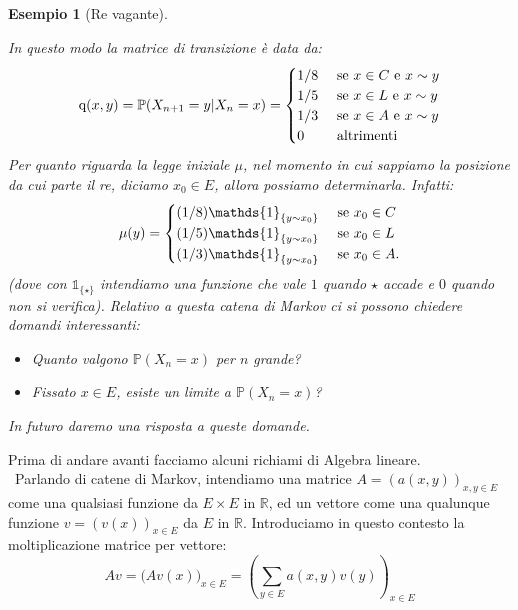 \documentclass[11pt]{book}
\theoremstyle{Definizione}
\theoremstyle{TeoremaProposizioneLemmaCorollario}
\theoremstyle{OsservazioneNota}
\newtheorem{myes}{Esempio}[section]
\newcommand{\R}{\mathbb{R}}
\renewcommand{\P}{\mathbb{P}}
\newcommand{\q}{\textup{q}}
\newcommand{\uno}[1]{\mathds{1}_{#1}}
\begin{document}
\begin{myes}[Re vagante]
\begin{center}
\end{center}
In questo modo la matrice di transizione è data da:
$$
\q(x,y) = \P(X_{n+1} = y | X_n =x)= \begin{cases}
1/8 &\textup{ se }x\in C\textup{ e }x\sim y\\
1/5 &\textup{ se }x\in L\textup{ e }x\sim y\\
1/3 &\textup{ se }x\in A\textup{ e }x\sim y\\
0 &\textup{ altrimenti}
\end{cases}
$$
Per quanto riguarda la legge iniziale $\mu$, nel momento in cui sappiamo la posizione da cui parte il re, diciamo $x_0\in E$, allora possiamo determinarla. Infatti:
$$
\mu(y) = \begin{cases}
(1/8) \uno{\{y\sim x_0\}} &\textup{ se }x_0\in C\\
(1/5) \uno{\{y\sim x_0\}} &\textup{ se }x_0\in L\\
(1/3) \uno{\{y\sim x_0\}} &\textup{ se }x_0\in A.
\end{cases}
$$
(dove con $\uno{\{\star\}}$ intendiamo una funzione che vale $1$ quando $\star$ accade e $0$ quando non si verifica). Relativo a questa catena di Markov ci si possono chiedere domandi interessanti:
\begin{itemize}
\item Quanto valgono $\P(X_n = x)$ per $n$ grande?
\item Fissato $x\in E$, esiste un limite a $\P(X_n = x)$?
\end{itemize}
In futuro daremo una risposta a queste domande.
\end{myes}
Prima di andare avanti facciamo alcuni richiami di Algebra lineare.\\\
Parlando di catene di Markov, intendiamo una matrice $A = (a(x,y))_{x,y\in E}$ come una qualsiasi funzione da $E\times E$ in $\R$, ed un vettore come una qualunque funzione $v = (v(x))_{x\in E}$ da $E$ in $\R$. Introduciamo in questo contesto la moltiplicazione matrice per vettore:
$$
Av = \big(Av(x)\big)_{x\in E} = \left(\sum_{y\in E} a(x,y)v(y)\right)_{x\in E}
$$
\end{document}
